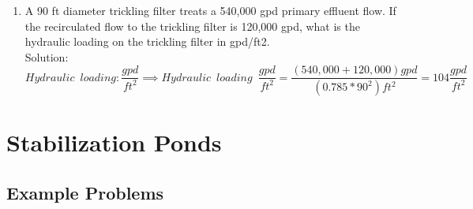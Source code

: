 \documentclass{article}
\begin{document}
\begin{enumerate}
\item A 90 ft diameter trickling filter treats a 540,000 gpd primary effluent flow. If the recirculated flow to the trickling filter is 120,000 gpd, what is the hydraulic loading on the trickling filter in gpd/ft2.\\
Solution:\\
$Hydraulic \enspace loading:\dfrac{gpd}{ft^2} \implies Hydraulic \enspace loading \enspace \dfrac{gpd}{ft^2}=\dfrac{(540,000+120,000)gpd}{(0.785*90^2)ft^2} =\boxed{104\dfrac{gpd}{ft^2}}$

\end{enumerate}


\newpage

\section{Stabilization Ponds}

\subsection{Example Problems} 
\end{document}
